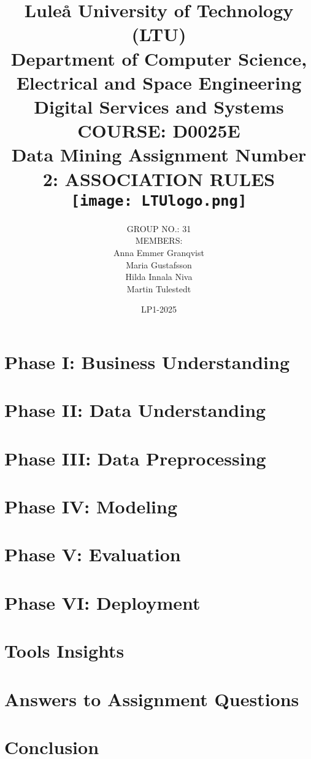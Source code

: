 \documentclass[12pt,a4paper,notitlepage]{report}
\title{
    {\large Luleå University of Technology (LTU)}\\
    {\large Department of Computer Science, Electrical and Space Engineering}\\
    {\large Digital Services and Systems}\\
    {\large COURSE: D0025E}\\
    {Data Mining Assignment Number 2: ASSOCIATION RULES}\\
    {\centering\texttt{[image: LTUlogo.png]}}\\
}
\author{
    GROUP NO.: 31\\
    \vspace{0.3cm}
    MEMBERS:\\
    Anna Emmer Granqvist\\
    Maria Gustafsson\\
    Hilda Innala Niva\\
    Martin Tulestedt
}
\date{LP1-2025}
\begin{document}
\maketitle




\tableofcontents
\clearpage
{}

\chapter{Phase I: Business Understanding}


\chapter{Phase II: Data Understanding}


\chapter{Phase III: Data Preprocessing}


\chapter{Phase IV: Modeling}


\chapter{Phase V: Evaluation}


\chapter{Phase VI: Deployment}


\chapter{Tools Insights}



\chapter{Answers to Assignment Questions}



\chapter{Conclusion}


\printbibliography
\end{document}
